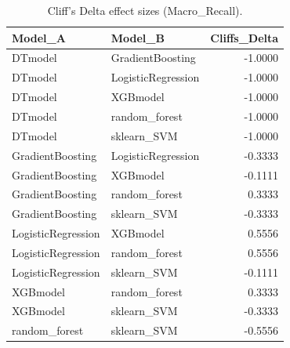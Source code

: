 \begin{table}[t]
\centering
\begin{tabular}{llr}
\toprule
Model_A & Model_B & Cliffs_Delta \\
\midrule
DTmodel & GradientBoosting & -1.0000 \\
DTmodel & LogisticRegression & -1.0000 \\
DTmodel & XGBmodel & -1.0000 \\
DTmodel & random_forest & -1.0000 \\
DTmodel & sklearn_SVM & -1.0000 \\
GradientBoosting & LogisticRegression & -0.3333 \\
GradientBoosting & XGBmodel & -0.1111 \\
GradientBoosting & random_forest & 0.3333 \\
GradientBoosting & sklearn_SVM & -0.3333 \\
LogisticRegression & XGBmodel & 0.5556 \\
LogisticRegression & random_forest & 0.5556 \\
LogisticRegression & sklearn_SVM & -0.1111 \\
XGBmodel & random_forest & 0.3333 \\
XGBmodel & sklearn_SVM & -0.3333 \\
random_forest & sklearn_SVM & -0.5556 \\
\bottomrule
\end{tabular}
\caption{Cliff's Delta effect sizes (Macro_Recall).}
\label{tab:cliffs_Macro_Recall}
\end{table}